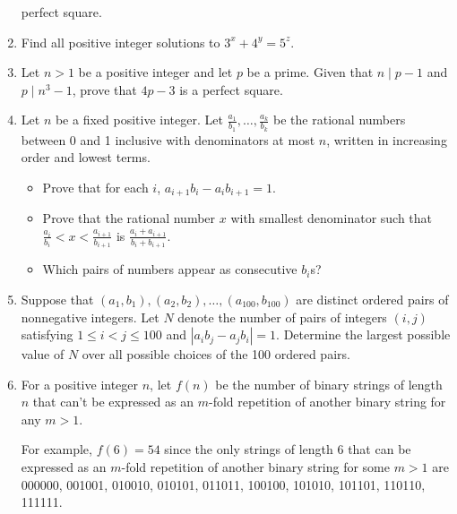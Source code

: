 \documentclass{article}
\begin{document}
\begin{enumerate}
    perfect square.
  \item Find all positive integer solutions to $3^x+4^y=5^z$.
  \item Let $n>1$ be a positive integer and let $p$ be a prime. Given that
    $n\mid p-1$ and $p\mid n^3-1$, prove that $4p-3$ is a perfect square.
  \item 
  Let $n$ be a fixed positive integer. Let
  $\frac{a_1}{b_1},\ldots,\frac{a_k}{b_k}$ be the rational numbers between 0
  and 1 inclusive with denominators at most $n$, written in increasing order
  and lowest terms.
  \begin{itemize}
    \item Prove that for each $i$, $a_{i+1}b_i-a_i b_{i+1}=1$.
    \item Prove that the rational number $x$ with smallest denominator such
      that $\frac{a_i}{b_i}<x<\frac{a_{i+1}}{b_{i+1}}$ is
      $\frac{a_i+a_{i+1}}{b_i+b_{i+1}}$. 
    \item Which pairs of numbers appear as consecutive $b_i$s?
  \end{itemize}
  \item Suppose that $(a_1,b_1),(a_2,b_2),\ldots,(a_{100},b_{100})$ are distinct
    ordered pairs of nonnegative integers.
    Let $N$ denote the number of pairs of integers $(i,j)$ satisfying
    $1\leq i<j\leq 100$ and $|a_i b_j-a_j b_i|=1$. 
    Determine the largest possible value of $N$ over all possible choices of the
    100 ordered pairs.
  \item For a positive integer $n$, let $f(n)$ be the number of binary strings of length $n$ that
      can't be expressed as an $m$-fold repetition of another binary string for
      any $m>1$.

      For example, $f(6)=54$ since the only strings of length 6 that can be
      expressed as an $m$-fold repetition of another binary string for some $m>1$
      are 000000, 001001, 010010, 010101, 011011, 100100, 101010, 101101, 110110,
      111111.
       

\end{enumerate}
\end{document}
